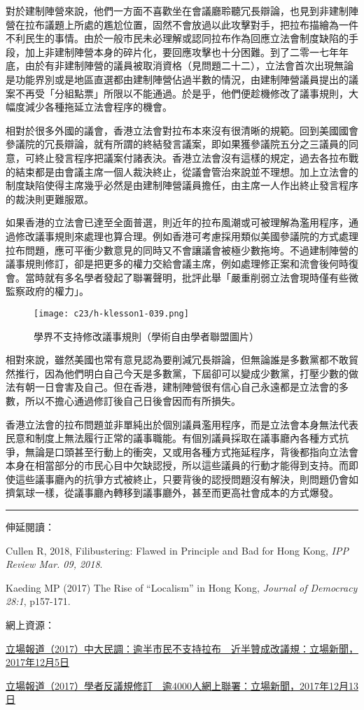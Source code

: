 對於建制陣營來說，他們一方面不喜歡坐在會議廳聆聽冗長辯論，也見到非建制陣營在拉布議題上所處的尷尬位置，固然不會放過以此攻擊對手，把拉布描繪為一件不利民生的事情。由於一般市民未必理解或認同拉布作為回應立法會制度缺陷的手段，加上非建制陣營本身的碎片化，要回應攻擊也十分困難。到了二零一七年年底，由於有非建制陣營的議員被取消資格（見問題二十二），立法會首次出現無論是功能界別或是地區直選都由建制陣營佔過半數的情況，由建制陣營議員提出的議案不再受「分組點票」所限以不能通過。於是乎，他們便趁機修改了議事規則，大幅度減少各種拖延立法會程序的機會。

相對於很多外國的議會，香港立法會對拉布本來沒有很清晰的規範。回到美國國會參議院的冗長辯論，就有所謂的終結發言議案，即如果獲參議院五分之三議員的同意，可終止發言程序把議案付諸表決。香港立法會沒有這樣的規定，過去各拉布戰的結束都是由會議主席一個人裁決終止，從議會管治來說並不理想。加上立法會的制度缺陷使得主席幾乎必然是由建制陣營議員擔任，由主席一人作出終止發言程序的裁決則更難服眾。

如果香港的立法會已達至全面普選，則近年的拉布風潮或可被理解為濫用程序，通過修改議事規則來處理也算合理。例如香港可考慮採用類似美國參議院的方式處理拉布問題，應可平衝少數意見的同時又不會讓議會被極少數拖垮。不過建制陣營的議事規則修訂，卻是把更多的權力交給會議主席，例如處理修正案和流會後何時復會。當時就有多名學者發起了聯署聲明，批評此舉「嚴重削弱立法會現時僅有些微監察政府的權力」。

\begin{figure}[htbp]
    \centering
    \texttt{[image: c23/h-klesson1-039.png]}
    \caption{學界不支持修改議事規則（學術自由學者聯盟圖片）}
\end{figure}

相對來說，雖然美國也常有意見認為要削減冗長辯論，但無論誰是多數黨都不敢貿然推行，因為他們明白自己今天是多數黨，下屆卻可以變成少數黨，打壓少數的做法有朝一日會害及自己。但在香港，建制陣營很有信心自己永遠都是立法會的多數，所以不擔心通過修訂後自己日後會因而有所損失。

香港立法會的拉布問題並非單純出於個別議員濫用程序，而是立法會本身無法代表民意和制度上無法履行正常的議事職能。有個別議員採取在議事廳內各種方式抗爭，無論是口頭甚至行動上的衝突，又或用各種方式拖延程序，背後都指向立法會本身在相當部分的市民心目中欠缺認授，所以這些議員的行動才能得到支持。而即使這些議事廳內的抗爭方式被終止，只要背後的認授問題沒有解決，則問題仍會如擠氣球一樣，從議事廳內轉移到議事廳外，甚至而更高社會成本的方式爆發。

\rule[-10pt]{15cm}{0.05em}

伸延閱讀：

Cullen R, 2018, Filibustering: Flawed in Principle and Bad for Hong Kong, \textit{IPP Review Mar. 09, 2018}.

Kaeding MP (2017) The Rise of “Localism” in Hong Kong, \textit{Journal of Democracy 28:1}, p157-171.


網上資源：

\href{https://thestandnews.com/politics/中大民調-逾半市民不支持拉布/}{立場報道（2017）中大民調：逾半市民不支持拉布　近半贊成改議規：立場新聞，2017年12月5日}

\href{https://thestandnews.com/politics/學者反議規修訂-逾4000人網上聯署/}{立場報道（2017）學者反議規修訂　逾4000人網上聯署：立場新聞，2017年12月13日}